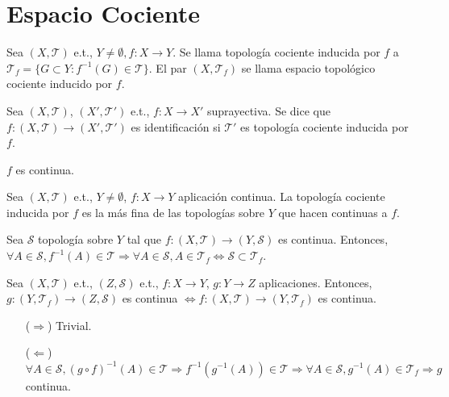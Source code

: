 \section{Espacio Cociente}

\begin{defn}
  Sea $( X, \mathcal{T} )$ e.t., $Y \neq \emptyset, f: X \to Y$. Se llama topología cociente inducida por $f $ a $\mathcal{T}_{f} = \{ G \subset Y : f^{-1}(G) \in \mathcal{T} \}$. El par $( X , \mathcal{T}_{f})$ se llama espacio topológico cociente inducido por $f$.
\end{defn}

\begin{defn}[Identificación]
  Sea $( X, \mathcal{T} )$, $( X', \mathcal{T}' )$ e.t., $f: X \to X'$ suprayectiva. Se dice que $f: ( X, \mathcal{T} ) \to ( X', \mathcal{T}' )$ es identificación si $\mathcal{T}'$ es topología cociente inducida por $f$.
\end{defn}

\begin{obs}
  $f$ es continua.
\end{obs}

\begin{prop}
  Sea $( X, \mathcal{T} )$ e.t., $Y \neq \emptyset$, $f: X \to Y$ aplicación continua. La topología cociente inducida por $f$ es la más fina de las topologías sobre $Y$ que hacen continuas a $f$.
\end{prop}

\begin{dem}
  Sea $\mathcal{S}$ topología sobre $Y$ tal que $f: ( X, \mathcal{T} ) \to ( Y, \mathcal{S} )$ es continua. Entonces, $\forall A \in \mathcal{S}, f^{-1}(A) \in \mathcal{T} \Rightarrow \forall A \in \mathcal{S}, A \in \mathcal{T}_{f} \Leftrightarrow \mathcal{S} \subset \mathcal{T}_{f}$.
\end{dem}

\begin{prop}
  Sea $( X, \mathcal{T} )$ e.t., $( Z, \mathcal{S} )$ e.t., $f: X \to Y$, $g: Y \to Z$ aplicaciones. Entonces, $g: (Y, \mathcal{T}_{f}) \to (Z,\mathcal{S})$ es continua $\Leftrightarrow f: (X, \mathcal{T}) \to (Y, \mathcal{T}_{f})$ es continua.
\end{prop}
 
\begin{dem}
  \begin{enumerate}[label=(\roman*)]
    \item [($\Rightarrow$)] Trivial.
    \item [($\Leftarrow$)] $\forall A \in \mathcal{S}, (g \circ f)^{-1}(A) \in \mathcal{T} \Rightarrow f^{-1}(g^{-1}(A)) \in \mathcal{T} \Rightarrow \forall A \in \mathcal{S}, g^{-1}(A) \in \mathcal{T}_{f} \Rightarrow g$ continua.
  \end{enumerate} 
\end{dem}

